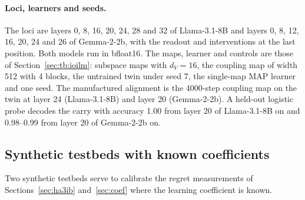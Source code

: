 \documentclass[11pt,a4paper]{article}
\newcommand{\dv}{d_V}
\begin{document}
\paragraph{Loci, learners and seeds.} The loci are layers 0, 8, 16, 20, 24, 28 and 32 of Llama-3.1-8B and layers 0, 8, 12, 16, 20, 24 and 26 of Gemma-2-2b, with the readout and interventions at the last position. Both models run in bfloat16. The maps, learner and controls are those of Section~\ref{sec:tb:ioilm}: subspace maps with $\dv=16$, the coupling map of width 512 with 4 blocks, the untrained twin under seed 7, the single-map MAP learner and one seed. The manufactured alignment is the 4000-step coupling map on the twin at layer 24 (Llama-3.1-8B) and layer 20 (Gemma-2-2b). A held-out logistic probe decodes the carry with accuracy 1.00 from layer 20 of Llama-3.1-8B on and 0.98--0.99 from layer 20 of Gemma-2-2b on.

\subsection{Synthetic testbeds with known coefficients}
\label{sec:tb:synthetic}

Two synthetic testbeds serve to calibrate the regret measurements of Sections~\ref{sec:ha3ib} and~\ref{sec:coef} where the learning coefficient is known.
\end{document}
